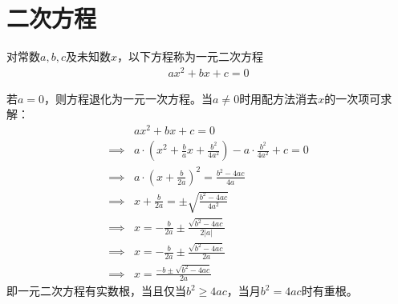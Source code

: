 
\chapter{二次方程}
\label{chap:quadratic-equation}

\begin{definition}[一元二次方程]
  对常数$a,b,c$及未知数$x$，以下方程称为一元二次方程
  \begin{align*}
    ax^2+bx+c=0
  \end{align*}
\end{definition}

若$a=0$，则方程退化为一元一次方程。当$a\ne0$时用配方法消去$x$的一次项可求解：
\begin{align*}
  &ax^2+bx+c=0\\
  \implies& a\cdot\left(x^2+\frac ba x + \frac{b^2}{4a^2}\right) - a\cdot\frac{b^2}{4a^2} + c = 0\\
  \implies& a\cdot\left(x+\frac{b}{2a}\right)^2=\frac{b^2-4ac}{4a}\\
  \implies& x+\frac{b}{2a} =\pm\sqrt{\frac{b^2-4ac}{4a^2}}\\
  \implies& x=-\frac{b}{2a}\pm\frac{\sqrt{b^2-4ac}}{2|a|}\\
  \implies& x=-\frac{b}{2a}\pm\frac{\sqrt{b^2-4ac}}{2a}\\
  \implies& x=\frac{-b\pm\sqrt{b^2-4ac}}{2a}
\end{align*}
即一元二次方程有实数根，当且仅当$b^2\ge4ac$，当月$b^2=4ac$时有重根。
